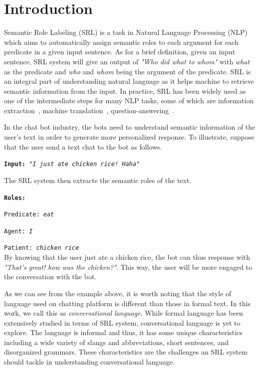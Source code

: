 \section{Introduction}
Semantic Role Labeling (SRL) is a task in Natural Language Processing (NLP) which aims to automatically assign semantic roles to each argument for each predicate in a given input sentence. As for a brief definition, given an input sentence, SRL system will give an output of \textit{"Who did what to whom"} with \textit{what} as the predicate and \textit{who} and \textit{whom} being the argument of the predicate. SRL is an integral part of understanding natural language as it helps machine to retrieve semantic information from the input. In practice, SRL has been widely used as one of the intermediate steps for many NLP tasks, some of which are information extraction~\cite{emanuele2013textual, surdeanu2003using}, machine translation~\cite{liu2010semantic, lo2013improving}, question-answering~\cite{shen2007using, moschitti2003open}.

In the chat bot industry, the bots need to understand semantic information of the user's text in order to generate more personalized response. To illustrate, suppose that the user send a text chat to the bot as follows.

\texttt{\textbf{Input:} \textit{"I just ate chicken rice! Haha"}}

The SRL system then extracts the semantic roles of the text.

\texttt{\textbf{Roles:}}

\texttt{Predicate: \textit{eat}}

\texttt{Agent: \textit{I}}

\texttt{Patient: \textit{chicken rice}}
\\

By knowing that the user just ate a chicken rice, the bot can thus response with \textit{"That's great! how was the chicken?"}. This way, the user will be more engaged to the conversation with the bot.

As we can see from the example above, it is worth noting that the style of language used on chatting platform is different than those in formal text. In this work, we call this as \textit{conversational language}. While formal language has been extensively studied in terms of SRL system, conversational language is yet to explore. The language is informal and thus, it has some unique characteristics including a wide variety of slangs and abbreviations, short sentences, and disorganized grammars. These characteristics are the challenges an SRL system should tackle in understanding conversational language.

